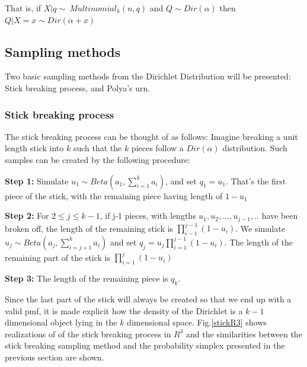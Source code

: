 \documentclass[twoside,hidelinks]{article}
\begin{document}
That is,  if $ X|q \sim\ Multinomial_k(n,q) $ and $ Q \sim Dir( \alpha ) $ then $ Q| X=x \sim Dir( \alpha + x) $

\subsection{Sampling methods}

Two basic sampling methods from the Dirichlet Distribution will be presented: Stick breaking process, and Polya's urn.

\subsubsection{Stick breaking process}

The stick breaking process can be thought of as follows: Imagine breaking a unit length stick into $k$ such that the $k$ pieces follow a $Dir( \alpha)$  distribution. Such samples can be created by the following procedure:
\begin{compactitem}
	\item  \textbf{Step 1:} Simulate $ u_1 \sim Beta(a_1, \sum_{i=1}^k a_i ) $, and set $q_1 = u_1$. That's the first piece of the stick, with the remaining piece having length of $ 1-u_1$
	\item \textbf{Step 2:} For $ 2 \leq j \leq k-1$, if j-1 pieces, with lengths  $u_1,u_2,...,u_{j-1},..$ have been broken off, the length of the remaining stick is $\prod_{i-1}^{j-1} (1 - u_i) $. We simulate $ u_j \sim Beta( a_j, \sum_{i=j+1}^k a_i) $ and set  $q_j=u_j \prod_{i=1}^{j-1}(1-u_i)$. The length of the remaining part of the stick is  $\prod_{i=1}^{j}(1-u_i)$
	\item  \textbf{Step 3:} The length of the remaining piece is $q_k$.


\end{compactitem}
Since the last part of the stick will always be created so that we end up with a valid pmf, it is made explicit how the density of the Dirichlet is  a ${k-1}$ dimensional object lying in the $k$ dimensional space. Fig.\ref{stickR3} shows realizations of of the stick breaking process in $R^3$ and the similarities between the stick breaking sampling method and the probability simplex presented in the previous section are shown.
\end{document}
